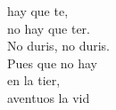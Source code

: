 \begin{cancion}%
	 hay que te,\\
	no hay que ter.\\
	No duris, no duris. \\
	Pues que no hay \\
	en la tier,\\
	aventuos la vid\\
\end{cancion}%
